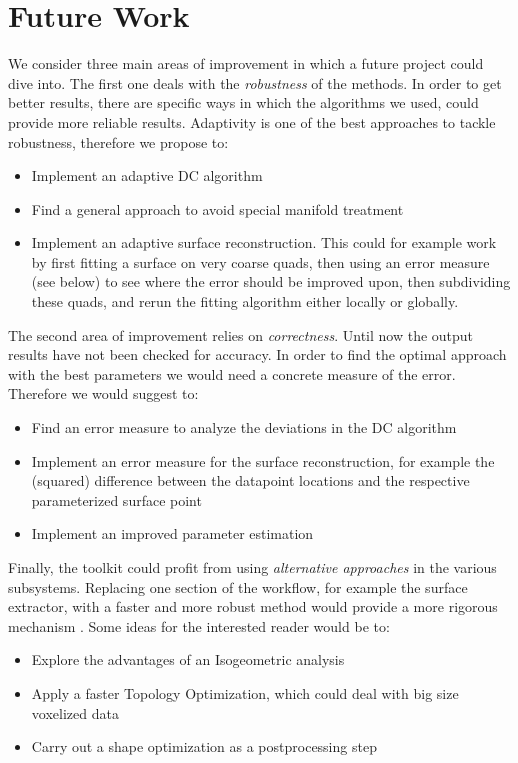 \section{Future Work}
\label{sec:Future}
We consider three main areas of improvement in which a future project could dive into. The first one deals with the \textit{robustness} of the methods.  In order to get better results, there are specific ways in which the algorithms we used, could provide more reliable results. Adaptivity is one of the best approaches to tackle robustness, therefore we propose to:  
\begin{itemize}
\item Implement an adaptive DC algorithm
\item Find a general approach to  avoid special manifold treatment
\item Implement an adaptive surface reconstruction. This could for example work by first fitting a surface on very coarse quads, then using an error measure (see below) to see where the error should be improved upon, then subdividing these quads, and rerun the fitting algorithm either locally or globally.
\end{itemize}
The second area of improvement relies on \textit{correctness}. Until now the output results have not been checked for accuracy. In order to find the optimal approach with the best parameters we would need a concrete measure of the error. Therefore we would suggest to:
\begin{itemize}
\item Find an error measure to analyze the deviations in the DC algorithm
\item Implement an error measure for the surface reconstruction, for example the (squared) difference between the datapoint locations and the respective parameterized surface point
\item Implement an improved parameter estimation %
\end{itemize}
Finally, the toolkit could profit from using \textit{alternative approaches} in the various subsystems. Replacing one section of the workflow, for example the surface extractor, with a faster and more robust method would provide a more rigorous mechanism . Some ideas for the interested reader would be to:
\begin{itemize}
\item Explore the advantages of an Isogeometric analysis

\item Apply a faster Topology Optimization, which could deal with big size voxelized data

\item Carry out a shape optimization as a postprocessing step
\end{itemize}
